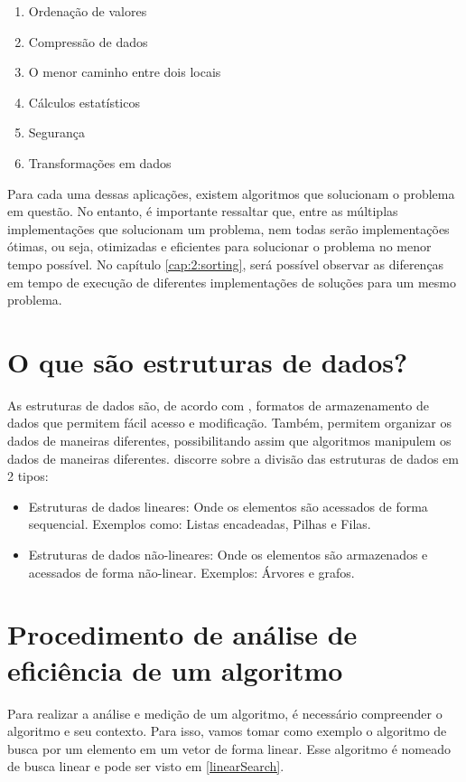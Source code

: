 \begin{enumerate}
    \item Ordenação de valores
    \item Compressão de dados
    \item O menor caminho entre dois locais
    \item Cálculos estatísticos
    \item Segurança
    \item Transformações em dados
\end{enumerate}

Para cada uma dessas aplicações, existem algoritmos que solucionam o problema em questão. No entanto, é importante
ressaltar que, entre as múltiplas implementações que solucionam um problema, nem todas serão implementações ótimas,
ou seja, otimizadas e eficientes para solucionar o problema no menor tempo possível. No capítulo \ref{cap:2:sorting},
será possível observar as diferenças em tempo de execução de diferentes implementações de soluções para um mesmo
problema.

\section{O que são estruturas de dados?}

As estruturas de dados são, de acordo com \cite{cormen2022algorithms}, formatos de armazenamento de dados
que permitem fácil acesso e modificação. Também, permitem organizar os dados de maneiras diferentes, possibilitando assim que
algoritmos manipulem os dados de maneiras diferentes. \cite{narasimha2017data} discorre sobre a divisão das estruturas
de dados em 2 tipos:

\begin{itemize}
    \item Estruturas de dados lineares: Onde os elementos são acessados de forma sequencial. Exemplos como: Listas encadeadas, Pilhas e Filas.
    \item Estruturas de dados não-lineares: Onde os elementos são armazenados e acessados de forma não-linear. Exemplos: Árvores e grafos.
\end{itemize}

\section{Procedimento de análise de eficiência de um algoritmo}

Para realizar a análise e medição de um algoritmo, é necessário compreender o algoritmo e seu contexto. Para isso, vamos
tomar como exemplo o algoritmo de busca por um elemento em um vetor de forma linear. Esse algoritmo é nomeado de busca
linear e pode ser visto em \ref{linearSearch}.

